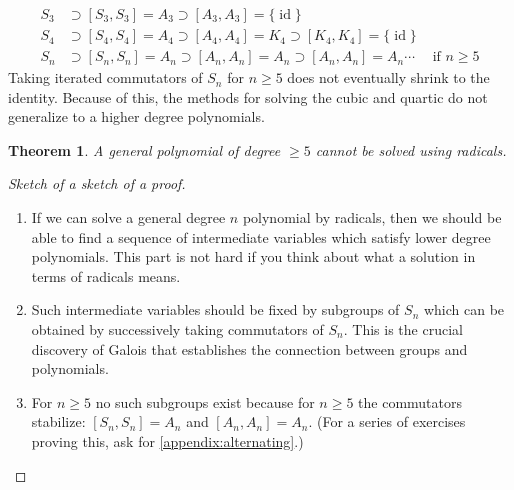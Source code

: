 \documentclass[reqno, 12pt, letter]{article}
\theoremstyle{plain}
\newtheorem{theorem}{Theorem}[section]
\theoremstyle{definition}
\theoremstyle{remark}
\numberwithin{equation}{section}
\DeclareMathOperator\id{id}
\begin{document}
\begin{align*}
	S_3 & \supset [S_3, S_3] = A_3 \supset [A_3, A_3] = \{ \id \}                          &                      \\
	S_4 & \supset [S_4, S_4] = A_4 \supset [A_4, A_4] = K_4 \supset [K_4, K_4] = \{ \id \} &                      \\
	S_n & \supset [S_n, S_n] = A_n \supset [A_n, A_n] = A_n \supset [A_n, A_n] = A_n \cdots                                & \text{ if } n \geq 5
\end{align*}
Taking iterated commutators of $S_n$ for $n \geq 5$ does not eventually shrink to the identity. Because of this, the methods for solving the cubic and quartic do not generalize to a higher degree polynomials.
\begin{theorem}
	A general polynomial of degree $ \ge 5$ cannot be solved using radicals.
\end{theorem}
\begin{proof}[Sketch of a sketch of a proof] $ $
	\begin{enumerate}
		\item If we can solve a general degree $ n$ polynomial by radicals, then we should be able to find a sequence of intermediate variables which satisfy lower degree polynomials. {This part is not hard if you think about what a solution in terms of radicals means.}
		\item Such intermediate variables should be fixed by subgroups of $ S_n$ which can be obtained by successively taking commutators of $ S_n$. {This is the crucial discovery of Galois that establishes the connection between groups and polynomials.}
		\item For $ n \ge 5$ no such subgroups exist because for $ n \ge 5$ the commutators stabilize: $[S_n, S_n] = A_n$ and $ [A_n, A_n] = A_n$.
		(For a series of exercises proving this, ask for \autoref{appendix:alternating}.)
	\end{enumerate}
\end{proof}
\end{document}
